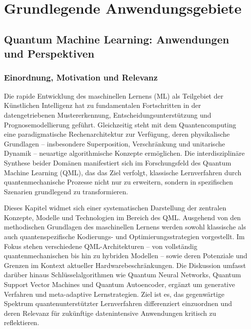 \chapter{Grundlegende Anwendungsgebiete}
\label{trends} %



\section{Quantum Machine Learning: Anwendungen und Perspektiven}
\subsection{Einordnung, Motivation und Relevanz}

\noindent  
Die rapide Entwicklung des maschinellen Lernens (ML) als Teilgebiet der Künstlichen Intelligenz hat zu fundamentalen Fortschritten in der datengetriebenen Mustererkennung, Entscheidungsunterstützung und Prognosemodellierung geführt. Gleichzeitig steht mit dem Quantencomputing eine paradigmatische Rechenarchitektur zur Verfügung, deren physikalische Grundlagen – insbesondere Superposition, Verschränkung und unitarische Dynamik – neuartige algorithmische Konzepte ermöglichen. Die interdisziplinäre Synthese beider Domänen manifestiert sich im Forschungsfeld des Quantum Machine Learning (QML), das das Ziel verfolgt, klassische Lernverfahren durch quantenmechanische Prozesse nicht nur zu erweitern, sondern in spezifischen Szenarien grundlegend zu transformieren.

Dieses Kapitel widmet sich einer systematischen Darstellung der zentralen Konzepte, Modelle und Technologien im Bereich des QML. Ausgehend von den methodischen Grundlagen des maschinellen Lernens werden sowohl klassische als auch quantenspezifische Kodierungs- und Optimierungsstrategien vorgestellt. Im Fokus stehen verschiedene QML-Architekturen – von vollständig quantenmechanischen bis hin zu hybriden Modellen – sowie deren Potenziale und Grenzen im Kontext aktueller Hardwarebeschränkungen. Die Diskussion umfasst darüber hinaus Schlüsselalgorithmen wie Quantum Neural Networks, Quantum Support Vector Machines und Quantum Autoencoder, ergänzt um generative Verfahren und meta-adaptive Lernstrategien. Ziel ist es, das gegenwärtige Spektrum quantenunterstützter Lernverfahren differenziert einzuordnen und deren Relevanz für zukünftige datenintensive Anwendungen kritisch zu reflektieren.


